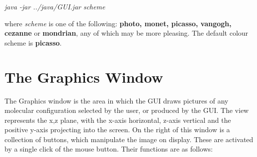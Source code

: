 \vspace{0.25cm}
{\em java -jar ../java/GUI.jar scheme}
\vspace{0.25cm}

\noindent where {\em scheme} is one of the following: {\bf photo,
monet, picasso, vangogh, cezanne} or {\bf mondrian}, 
any of which may be more pleasing. The default colour scheme 
is {\bf picasso}.

\section{The Graphics Window}

The Graphics window is the area in which the GUI draws pictures of any
molecular configuration selected by the user, or produced by the
GUI. The view represents the x,z plane, with the x-axis horizontal,
z-axis vertical and the positive y-axis projecting into the screen. On the
right of this window is a collection of buttons, which manipulate the
image on display. These are activated by a single click of the mouse
button. Their functions are as follows:

